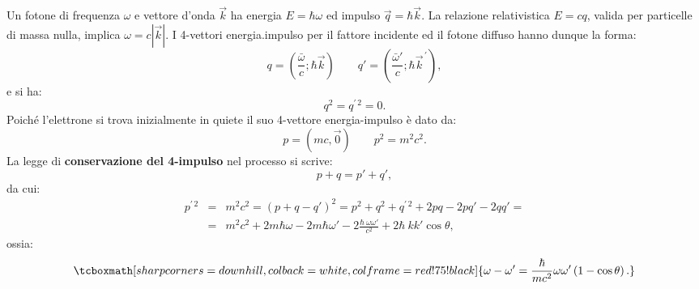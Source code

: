 	
Un fotone di frequenza $\omega$ e vettore d'onda $\vec{k}$ ha energia $E = \hbar \omega$ ed impulso $\vec{q}= \hbar \vec{k}$. La relazione relativistica $E=cq$, valida per particelle di massa nulla, implica $\omega = c|\vec{k}|$. I 4-vettori energia.impulso per il fattore incidente ed il fotone diffuso hanno dunque la forma:
	\begin{equation}
		q=\left(\frac{\bar \omega}{c}; \hbar \vec{k} \right)\qquad q' = \left(\frac{\bar \omega'}{c}; \hbar {\vec{k}}^{\, \prime}\right),
	\end{equation}
e si ha:
	\begin{equation}
		q^2 = q^{\prime \, 2}=0.
	\end{equation}
Poiché l'elettrone si trova inizialmente in quiete il suo 4-vettore energia-impulso è dato da:
	\begin{equation}
		p=\left(mc, \vec{0} \right)\qquad p^2 =m^2 c^2.
	\end{equation}
La legge di \textbf{conservazione del 4-impulso} nel processo si scrive:
	\begin{equation}
		p+q=p'+q',
	\end{equation}
da cui:
	\begin{eqnarray}
	p^{\prime \, 2} &=& m^2 c^2 = \left( p +q -q'\right)^2= p^2 + q^2 +q^{\prime \, 2}+ 2pq - 2pq' -2 qq'= \nonumber \\
	&=& m^2c^2 + 2m\hbar \omega - 2m \hbar \omega ' - 2 \frac{\hbar \ \omega \omega '}{c^2}+2 \hbar \ k k'  \cos \theta ,
	\end{eqnarray}
ossia:
	\begin{equation}
		\tcboxmath[sharp corners=downhill ,colback=white,colframe=red!75!black]{
			\omega - \omega ' =\frac{\hbar}{m c^2} \omega \omega ' \left( 1-\cos \theta \right).
			}
	\label{eq:cap1_3}
	\end{equation}
